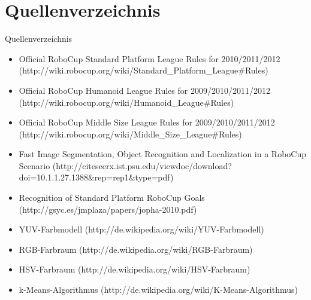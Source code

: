 \documentclass{beamer}
\begin{document}
\section*{Quellenverzeichnis}
\begin{frame}{Quellenverzeichnis}
\begin{tiny}
\begin{itemize}
    \item Official RoboCup Standard Platform League Rules for 2010/2011/2012  (http://wiki.robocup.org/wiki/Standard\_Platform\_League\#Rules)
    \item Official RoboCup Humanoid League Rules for 2009/2010/2011/2012 (http://wiki.robocup.org/wiki/Humanoid\_League\#Rules)
    \item Official RoboCup Middle Size League Rules for 2009/2010/2011/2012 (http://wiki.robocup.org/wiki/Middle\_Size\_League\#Rules)
    \item Fast Image Segmentation, Object Recognition and Localization in a RoboCup Scenario (http://citeseerx.ist.psu.edu/viewdoc/download?doi=10.1.1.27.1388\&rep=rep1\&type=pdf)
    \item Recognition of Standard Platform RoboCup Goals (http://gsyc.es/jmplaza/papers/jopha-2010.pdf)
    \item YUV-Farbmodell (http://de.wikipedia.org/wiki/YUV-Farbmodell)
    \item RGB-Farbraum (http://de.wikipedia.org/wiki/RGB-Farbraum)
    \item HSV-Farbraum (http://de.wikipedia.org/wiki/HSV-Farbraum)
    \item k-Means-Algorithmus (http://de.wikipedia.org/wiki/K-Means-Algorithmus)
\end{itemize}
\end{tiny}
\end{frame}
\end{document}
